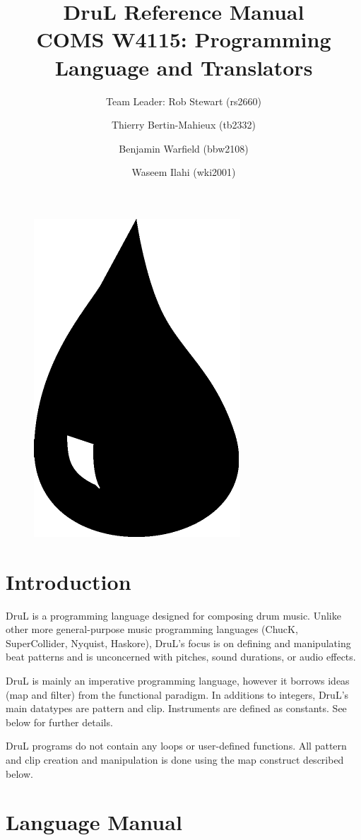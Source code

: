 \documentclass[11pt,twoside]{article}
\title{\textbf{DruL} Reference Manual\\
\vspace{1cm}
COMS W4115: Programming Language and Translators}
\author{Team Leader: Rob Stewart (rs2660) \and Thierry Bertin-Mahieux (tb2332) \and Benjamin Warfield (bbw2108) \and Waseem Ilahi (wki2001)}
\begin{document}
\maketitle
\begin{center}
\end{center}

\vspace{3cm}

\begin{figure}[h]
\begin{center}
\includegraphics[width=.2\columnwidth]{Water_Drop.pdf}
\end{center}
\end{figure}

\newpage





\section{Introduction}

DruL is a programming language designed for composing drum music.  Unlike other more general-purpose music programming languages (ChucK, SuperCollider, Nyquist, Haskore), DruL's focus is on defining and manipulating beat patterns and is unconcerned with pitches, sound durations, or audio effects.

DruL is mainly an imperative programming language, however it borrows ideas (map and filter) from the functional paradigm.  In additions to integers, DruL's main datatypes are pattern and clip. Instruments are defined as constants.  See below for further details.

DruL programs do not contain any loops or user-defined functions.  All pattern 
and clip creation and manipulation is done using the map construct described below.





\section{Language Manual}
\end{document}
